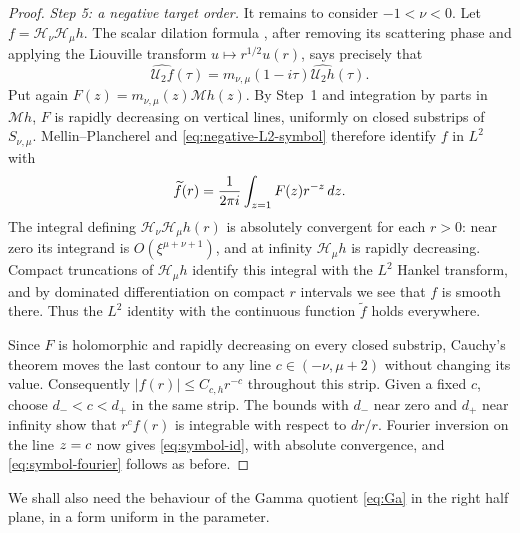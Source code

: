 \documentclass[11pt,a4paper,reqno,backref=page]{amsart}
\newcommand{\HH}{\mathcal H}                 %
\newcommand{\Mell}{\mathcal M}               %
\newcommand{\dd}{\,d}
\let\Re\relax\DeclareMathOperator{\Re}{Re}
\numberwithin{equation}{section}
\theoremstyle{definition}
\theoremstyle{remark}
\begin{document}
\begin{proof}
\emph{Step 5: a negative target order.} It remains to consider
$-1<\nu<0$. Let $f=\HH_\nu\HH_\mu h$. The scalar dilation
formula \cite[Eq.~(4.24)]{DerezinskiRichard2017}, after removing
its scattering phase and applying the Liouville transform
$u \mapsto r^{1/2}u(r)$, says precisely that
\begin{equation}\label{eq:negative-L2-symbol}
  \widehat{\mathcal U_2f}(\tau)
  =m_{\nu,\mu}(1-i\tau)\widehat{\mathcal U_2h}(\tau).
\end{equation}
Put again $F(z)=m_{\nu,\mu}(z)\Mell h(z)$. By Step~1 and
integration by parts in $\Mell h$, $F$ is rapidly decreasing on
vertical lines, uniformly on closed substrips of $S_{\nu,\mu}$.
Mellin--Plancherel and \eqref{eq:negative-L2-symbol} therefore
identify $f$ in $L^2$ with
\begin{equation*}
  \widetilde f(r)=\frac1{2\pi i}\int_{\Re z=1}F(z)r^{-z}\dd z.
\end{equation*}
The integral defining $\HH_\nu\HH_\mu h(r)$ is absolutely
convergent for each $r>0$: near zero its integrand is
$O(\xi^{\mu+\nu+1})$, and at infinity $\HH_\mu h$ is rapidly
decreasing. Compact truncations of $\HH_\mu h$ identify this
integral with the $L^2$ Hankel transform, and by dominated
differentiation on compact $r$ intervals we see that $f$ is
smooth there. Thus the $L^2$ identity with the continuous
function $\widetilde f$ holds everywhere.

Since $F$ is holomorphic and rapidly decreasing on every closed
substrip, Cauchy's theorem moves the last contour to any line
$c\in(-\nu,\mu+2)$ without changing its value. Consequently
$|f(r)|\le C_{c,h}r^{-c}$ throughout this strip. Given a fixed
$c$, choose $d_-<c<d_+$ in the same strip. The bounds with $d_-$
near zero and $d_+$ near infinity show that $r^cf(r)$ is
integrable with respect to $dr/r$. Fourier inversion on the line
$\Re z=c$ now gives \eqref{eq:symbol-id}, with absolute
convergence, and \eqref{eq:symbol-fourier} follows as before.
\end{proof}

We shall also need the behaviour of the Gamma quotient
\eqref{eq:Ga} in the right half plane, in a form uniform in the
parameter.
\end{document}
